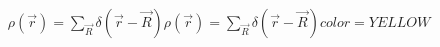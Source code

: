 \documentclass[preview]{standalone}
\begin{document}
\begin{align*}
\rho(\vec{r}) = \sum_{\vec{R}} \delta(\vec{r} - \vec{R}) \rho(\vec{r}) = \sum_{\vec{R}} \delta(\vec{r} - \vec{R}) color=YELLOW
\end{align*}
\end{document}

